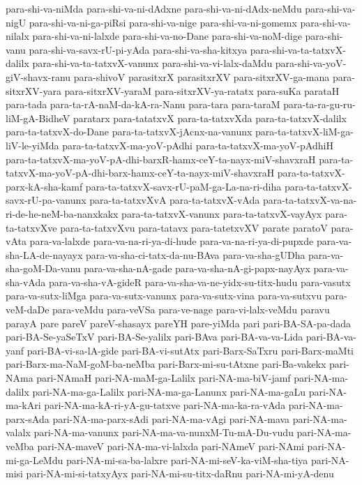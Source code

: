 {para-shi-va-niMda
para-shi-va-ni-dAdxne
para-shi-va-ni-dAdx-neMdu
para-shi-va-nigU
para-shi-va-ni-ga-piRsi
para-shi-va-nige
para-shi-va-ni-gomemx
para-shi-va-nilalx
para-shi-va-ni-lalxde
para-shi-va-no-Dane
para-shi-va-noM-dige
para-shi-vanu
para-shi-va-savx-rU-pi-yAda
para-shi-va-sha-kitxya
para-shi-va-ta-tatxvX-dalilx
para-shi-va-ta-tatxvX-vanunx
para-shi-va-vi-lalx-daMdu
para-shi-va-yoV-giV-shavx-ranu
para-shivoV
parasitxrX
parasitxrXV
para-sitxrXV-ga-mana
para-sitxrXV-yara
para-sitxrXV-yaraM
para-sitxrXV-ya-ratatx
para-suKa
parataH
para-tada
para-ta-rA-naM-da-kA-ra-Nanu
para-tara
para-taraM
para-ta-ra-gu-ru-liM-gA-BidheV
paratarx
para-tatatxvX
para-ta-tatxvXda
para-ta-tatxvX-dalilx
para-ta-tatxvX-do-Dane
para-ta-tatxvX-jAcnx-na-vanunx
para-ta-tatxvX-liM-ga-liV-le-yiMda
para-ta-tatxvX-ma-yoV-pAdhi
para-ta-tatxvX-ma-yoV-pAdhiH
para-ta-tatxvX-ma-yoV-pA-dhi-barxR-hamx-ceY-ta-nayx-miV-shavxraH
para-ta-tatxvX-ma-yoV-pA-dhi-barx-hamx-ceY-ta-nayx-miV-shavxraH
para-ta-tatxvX-parx-kA-sha-kamf
para-ta-tatxvX-savx-rU-paM-ga-La-na-ri-diha
para-ta-tatxvX-savx-rU-pa-vanunx
para-ta-tatxvXvA
para-ta-tatxvX-vAda
para-ta-tatxvX-va-na-ri-de-he-neM-ba-nanxkakx
para-ta-tatxvX-vanunx
para-ta-tatxvX-vayAyx
para-ta-tatxvXve
para-ta-tatxvXvu
para-tatavx
para-tatetxvXV
parate
paratoV
para-vAta
para-va-lalxde
para-va-na-ri-ya-di-hude
para-va-na-ri-ya-di-pupxde
para-va-sha-LA-de-nayayx
para-va-sha-ci-tatx-da-nu-BAva
para-va-sha-gUDha
para-va-sha-goM-Da-vanu
para-va-sha-nA-gade
para-va-sha-nA-gi-papx-nayAyx
para-va-sha-vAda
para-va-sha-vA-gideR
para-va-sha-va-ne-yidx-su-titx-hudu
para-vasutx
para-va-sutx-liMga
para-va-sutx-vanunx
para-va-sutx-vina
para-va-sutxvu
para-veM-daDe
para-veMdu
para-veVSa
para-ve-nage
para-vi-lalx-veMdu
paravu
parayA
pare
pareV
pareV-shasayx
pareYH
pare-yiMda
pari
pari-BA-SA-pa-dada
pari-BA-Se-yaSeTxV
pari-BA-Se-yalilx
pari-BAva
pari-BA-va-va-Lida
pari-BA-va-yanf
pari-BA-vi-sa-lA-gide
pari-BA-vi-sutAtx
pari-Barx-SaTxru
pari-Barx-maMti
pari-Barx-ma-NaM-goM-ba-neMba
pari-Barx-mi-su-tAtxne
pari-Ba-vakekx
pari-NAma
pari-NAmaH
pari-NA-maM-ga-Lalilx
pari-NA-ma-biV-jamf
pari-NA-ma-dalilx
pari-NA-ma-ga-Lalilx
pari-NA-ma-ga-Lanunx
pari-NA-ma-gaLu
pari-NA-ma-kAri
pari-NA-ma-kA-ri-yA-gu-tatxve
pari-NA-ma-ka-ra-vAda
pari-NA-ma-parx-sAda
pari-NA-ma-parx-sAdi
pari-NA-ma-vAgi
pari-NA-mava
pari-NA-ma-valalx
pari-NA-ma-vanunx
pari-NA-ma-va-nunxM-Tu-mA-Du-vudu
pari-NA-ma-veMba
pari-NA-maveV
pari-NA-ma-vi-lalxda
pari-NAmeV
pari-NAmi
pari-NA-mi-ga-LeMdu
pari-NA-mi-sa-ba-lalxre
pari-NA-mi-seV-ka-viM-sha-tiya
pari-NA-misi
pari-NA-mi-si-tatxyAyx
pari-NA-mi-su-titx-daRnu
pari-NA-mi-yA-denu
}

